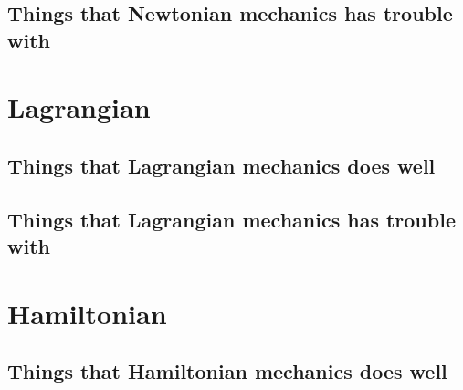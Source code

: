 \subsection{Things that Newtonian mechanics has trouble with}

\section{Lagrangian}

\subsection{Things that Lagrangian mechanics does well}

\subsection{Things that Lagrangian mechanics has trouble with}


\section{Hamiltonian}

\subsection{Things that Hamiltonian mechanics does well}

